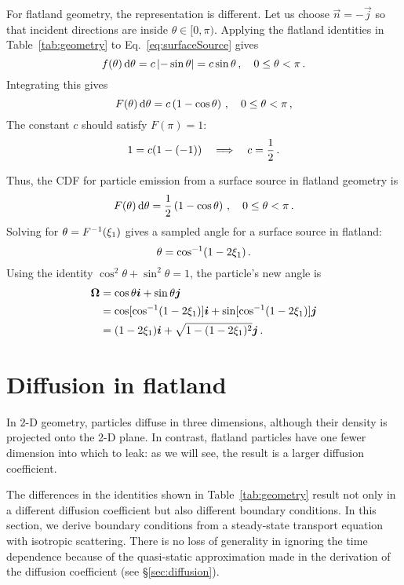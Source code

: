 For flatland geometry, the representation is different. Let us choose
$\vec{n} = -\vec{j}$ so that incident directions are inside
$\theta \in [0, \pi)$.
Applying the flatland identities in Table~\ref{tab:geometry} to
Eq.~\eqref{eq:surfaceSource} gives
\begin{equation*}
  f(\theta) \mathop{}\!\mathrm{d}\theta = c\left|  -\sin \theta \right|
  = c \sin \theta \,,\quad 0 \le \theta < \pi\,.
\end{equation*}
Integrating this gives
\begin{equation*}
  F(\theta) \mathop{}\!\mathrm{d}\theta = c \left( 1-\cos\theta \right)
  \,,\quad 0 \le \theta < \pi\,,
\end{equation*}
The constant $c$ should satisfy $F(\pi)=1$:
\begin{equation*}
  1 = c (1 - (-1) ) \quad \Longrightarrow \quad c=\frac{1}{2}\,.
\end{equation*}

Thus, the CDF for particle emission from a surface source in flatland geometry
is
\begin{equation*}
  F(\theta) \mathop{}\!\mathrm{d}\theta = \frac{1}{2} \left( 1-\cos\theta \right)
  \,,\quad 0 \le \theta < \pi\,.
\end{equation*}
Solving for $\theta = F^{-1}(\xi_1)$ gives a sampled angle for a surface source
in flatland:
\begin{equation*}
  \theta = \cos^{-1}(1 - 2\xi_1)\,.
\end{equation*}
Using the identity $\cos^2 \theta + \sin^2 \theta = 1$, the particle's new angle is
\begin{align*}
  \bm{\Omega} &= \cos \theta \bm{i} + \sin \theta \bm{j} \\
  &=  \cos[ \cos^{-1}(1 - 2\xi_1) ] \bm{i} + \sin[ \cos^{-1}(1 - 2\xi_1) ] \bm{j} \\
  &= (1 - 2\xi_1) \bm{i} + \sqrt{1 - (1 - 2\xi_1)^2} \bm{j}\,.
\end{align*}

\section{Diffusion in flatland}

In 2-D geometry, particles diffuse in three dimensions, although their density
is projected onto the 2-D plane. In contrast, flatland particles have one fewer
dimension into which to leak: as we will see, the result is a larger diffusion
coefficient.

The differences in the identities shown in Table~\ref{tab:geometry} result not
only in a different diffusion coefficient but also different boundary
conditions. In this section, we derive boundary conditions from a steady-state
transport equation with isotropic scattering. There is no loss of generality in
ignoring the time dependence because of the quasi-static approximation made in
the derivation of the diffusion coefficient (see \S\ref{sec:diffusion}).

